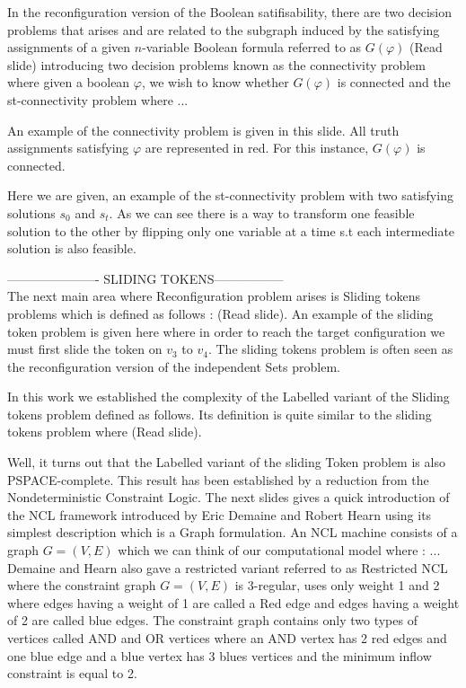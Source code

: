 In the reconfiguration version of the Boolean satifisability, there are two  decision problems that arises and are related to the subgraph induced by the satisfying assignments of a given $n$-variable Boolean formula referred to as $G(\varphi)$ (Read slide) introducing two decision problems known as the connectivity problem where given a boolean $\varphi$, we wish to know whether $G(\varphi)$ is connected and the st-connectivity problem where ... 

An example of the connectivity problem is given in this slide. All truth assignments satisfying $\varphi$ are represented in red. For this instance, $G(\varphi)$ is connected. 

Here we are given, an example of the st-connectivity problem with two satisfying solutions $s_0$ and $s_t$. As we can see there is a way to transform one feasible solution to the other by flipping only one variable at a time s.t each intermediate solution is also feasible. 

---------------------- SLIDING TOKENS----------------- \\ 

The next main area where Reconfiguration problem arises is Sliding tokens problems which is defined as follows : 
(Read slide). 
An example of the sliding token problem is given here where in order to reach the target configuration we must first slide the token on $v_3$ to $v_4$. The sliding tokens problem is often seen as the reconfiguration version of the independent Sets problem. 

In this work we established the complexity of the Labelled variant of the Sliding tokens problem defined as follows. Its definition is quite similar to the sliding tokens problem where (Read slide). 

Well, it turns out that the Labelled variant of the sliding Token problem is also PSPACE-complete. 
This result has been established by a reduction from the Nondeterministic Constraint Logic. The next slides gives a quick introduction of the NCL framework introduced by Eric Demaine and Robert Hearn using its simplest description which is a Graph formulation. An NCL machine consists of a graph $G = (V,E)$ which we can think of our computational model where : ... 
Demaine and Hearn also gave a restricted variant referred to as Restricted NCL where the constraint graph $G = (V,E)$ is
$3$-regular, uses only weight 1 and 2 where edges having a weight of 1 are called a Red edge and edges having a weight of 2 are called blue edges. The constraint graph contains only two types of vertices called AND and OR vertices where an AND vertex has 2 red edges and one blue edge and a blue vertex has 3 blues vertices and the minimum inflow constraint is equal to 2. 

